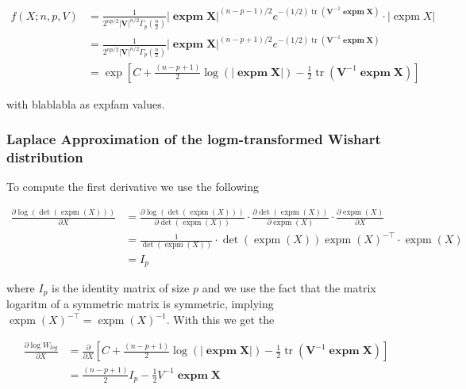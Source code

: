 \begin{align*}
f(X; n, p, V) &= \frac{1}{2^{np/2} \left|{\mathbf V}\right|^{n/2} \Gamma_p\left(\frac {n}{2}\right ) }{\left|\mathbf{\operatorname{expm}X}\right|}^{(n-p-1)/2} e^{-(1/2)\operatorname{tr}({\mathbf V}^{-1}\mathbf{\operatorname{expm}X})} \cdot |\operatorname{expm}X| \\ 
&= \frac{1}{2^{np/2} \left|{\mathbf V}\right|^{n/2} \Gamma_p\left(\frac {n}{2}\right ) }{\left|\mathbf{\operatorname{expm}X}\right|}^{(n-p+1)/2} e^{-(1/2)\operatorname{tr}({\mathbf V}^{-1}\mathbf{\operatorname{expm}X})} \\ 
&= \exp \left[C + \frac{(n-p+1)}{2} \log(\left|\mathbf{\operatorname{expm}X}\right|)  - \frac{1}{2}\operatorname{tr}({\mathbf V}^{-1}\mathbf{\operatorname{expm}X}) \right]
\end{align*}

with blablabla as expfam values. 

\subsubsection{Laplace Approximation of the logm-transformed Wishart distribution}

To compute the first derivative we use the following

\begin{align}
	\frac{\partial \log(\det(\operatorname{expm}(X)))}{\partial X} 
	&= \frac{\partial \log(\det(\operatorname{expm}(X)))}{\partial \det(\operatorname{expm}(X))} \cdot \frac{\partial \det(\operatorname{expm}(X))}{\partial \operatorname{expm}(X)} \cdot \frac{\partial \operatorname{expm}(X)}{\partial X} \\
	&= \frac{1}{\det(\operatorname{expm}(X))} \cdot \det(\operatorname{expm}(X)) \operatorname{expm}(X)^{-\top} \cdot \operatorname{expm}(X) \\
	&= I_p
\end{align}

where $I_p$ is the identity matrix of size $p$ and we use the fact that the matrix logaritm of a symmetric matrix is symmetric, implying $\operatorname{expm}(X)^{-\top} = \operatorname{expm}(X)^{-1}$. With this we get the 

\begin{align}
	\frac{\partial \log W_{log}}{\partial X} &= \frac{\partial}{\partial X} \left[C + \frac{(n-p+1)}{2} \log(\left|\mathbf{\operatorname{expm}X}\right|)  - \frac{1}{2}\operatorname{tr}({\mathbf V}^{-1}\mathbf{\operatorname{expm}X}) \right] \\
	&=  \frac{(n-p+1)}{2} I_p - \frac{1}{2}V^{-1}\mathbf{\operatorname{expm}X} 
\end{align}

